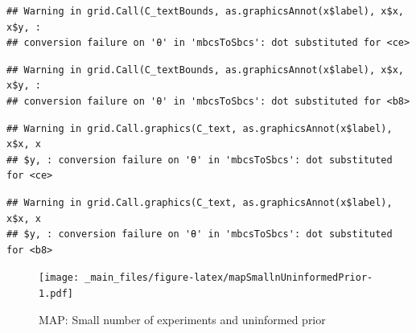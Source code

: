 \documentclass[]{book}
\theoremstyle{definition}
\theoremstyle{definition}
\theoremstyle{definition}
\theoremstyle{remark}
\begin{document}
\begin{verbatim}
## Warning in grid.Call(C_textBounds, as.graphicsAnnot(x$label), x$x, x$y, :
## conversion failure on 'θ' in 'mbcsToSbcs': dot substituted for <ce>
\end{verbatim}

\begin{verbatim}
## Warning in grid.Call(C_textBounds, as.graphicsAnnot(x$label), x$x, x$y, :
## conversion failure on 'θ' in 'mbcsToSbcs': dot substituted for <b8>
\end{verbatim}

\begin{verbatim}
## Warning in grid.Call.graphics(C_text, as.graphicsAnnot(x$label), x$x, x
## $y, : conversion failure on 'θ' in 'mbcsToSbcs': dot substituted for <ce>
\end{verbatim}

\begin{verbatim}
## Warning in grid.Call.graphics(C_text, as.graphicsAnnot(x$label), x$x, x
## $y, : conversion failure on 'θ' in 'mbcsToSbcs': dot substituted for <b8>
\end{verbatim}

\begin{figure}
\centering
\texttt{[image: \_main\_files/figure-latex/mapSmallnUninformedPrior-1.pdf]}
\caption{\label{fig:mapSmallnUninformedPrior}MAP: Small number of
experiments and uninformed prior}
\end{figure}
\end{document}
